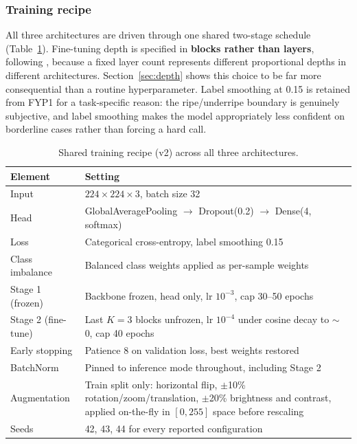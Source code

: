 \documentclass{article}
\begin{document}
\subsubsection{Training recipe}
\label{sec:recipe}

All three architectures are driven through one shared two-stage schedule (Table~\ref{tab:recipe}).
Fine-tuning depth is specified in \textbf{blocks rather than layers}, following
\citet{suharjito2021mobile}, because a fixed layer count represents different proportional depths in
different architectures. Section~\ref{sec:depth} shows this choice to be far more consequential than a
routine hyperparameter. Label smoothing at 0.15 is retained from FYP1 for a task-specific reason: the
ripe/underripe boundary is genuinely subjective, and label smoothing makes the model appropriately less
confident on borderline cases rather than forcing a hard call.

\begin{table}[t]
\centering
\caption{Shared training recipe (v2) across all three architectures.}
\label{tab:recipe}
\begin{tabular}{@{}p{3.6cm}p{9.8cm}@{}}
\toprule
Element & Setting \\
\midrule
Input & $224\times224\times3$, batch size 32 \\
Head & GlobalAveragePooling $\rightarrow$ Dropout(0.2) $\rightarrow$ Dense(4, softmax) \\
Loss & Categorical cross-entropy, label smoothing 0.15 \\
Class imbalance & Balanced class weights applied as per-sample weights \\
Stage 1 (frozen) & Backbone frozen, head only, lr $10^{-3}$, cap 30--50 epochs \\
Stage 2 (fine-tune) & Last $K{=}3$ blocks unfrozen, lr $10^{-4}$ under cosine decay to $\sim$0, cap 40 epochs \\
Early stopping & Patience 8 on validation loss, best weights restored \\
BatchNorm & Pinned to inference mode throughout, including Stage 2 \\
Augmentation & Train split only: horizontal flip, $\pm$10\% rotation/zoom/translation, $\pm$20\% brightness and contrast, applied on-the-fly in $[0,255]$ space before rescaling \\
Seeds & 42, 43, 44 for every reported configuration \\
\bottomrule
\end{tabular}
\end{table}
\end{document}
